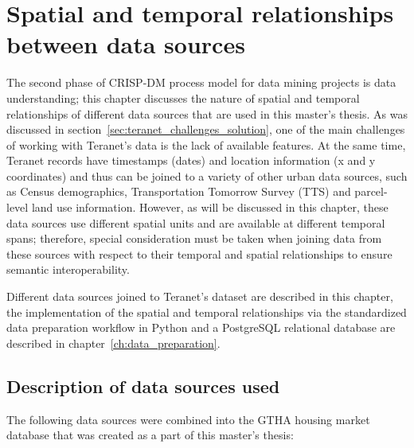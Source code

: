 \chapter{Spatial and temporal relationships between data sources} \label{ch:spatial_and_temporal_relationships}

The second phase of CRISP-DM process model for data mining projects is data understanding;
this chapter discusses the nature of spatial and temporal relationships of different data sources that are used in this master's thesis.
As was discussed in section~\ref{sec:teranet_challenges_solution}, one of the main challenges of working with Teranet's data is the lack of available features.
At the same time, Teranet records have timestamps (dates) and location information (x and y coordinates) and thus can be joined to a variety of other urban data sources, such as Census demographics, Transportation Tomorrow Survey (TTS) and parcel-level land use information.
However, as will be discussed in this chapter, these data sources use different spatial units and are available at different temporal spans;
therefore, special consideration must be taken when joining data from these sources with respect to their temporal and spatial relationships to ensure semantic interoperability.

Different data sources joined to Teranet's dataset are described in this chapter, the implementation of the spatial and temporal relationships via the standardized data preparation workflow in Python and a PostgreSQL relational database are described in chapter~\ref{ch:data_preparation}.

\section{Description of data sources used} \label{sec:description_of_data_sources}

The following data sources were combined into the GTHA housing market database that was created as a part of this master's thesis:

